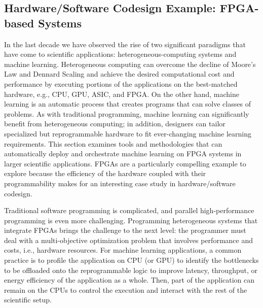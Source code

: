 \subsection{Hardware/Software Codesign Example: FPGA-based Systems}
\label{sec:codesign}

In the last decade we have observed the rise of two significant paradigms that have come to scientific applications: heterogeneous-computing systems and machine learning. Heterogeneous computing can overcome the decline of Moore's Law and Dennard Scaling and achieve the desired computational cost and performance by executing portions of the applications on the best-matched hardware, e.g., CPU, GPU, ASIC, and FPGA. On the other hand, machine learning is an automatic process that creates programs that can solve classes of problems. As with traditional programming, machine learning can significantly benefit from heterogeneous computing; in addition, designers can tailor specialized but reprogrammable hardware to fit ever-changing machine learning requirements. This section examines tools and methodologies that can automatically deploy and orchestrate machine learning on FPGA systems in larger scientific applications.  FPGAs are a particularly compelling example to explore because the efficiency of the hardware coupled with their programmability makes for an interesting case study in hardware/software codesign.   

Traditional software programming is complicated, and parallel high-performance programming is even more challenging. Programming heterogeneous systems that integrate FPGAs brings the challenge to the next level: the programmer must deal with a multi-objective optimization problem that involves performance and costs, i.e., hardware resources.
For machine learning applications, a common practice is to profile the application on CPU (or GPU) to identify the bottlenecks to be offloaded onto the reprogrammable logic to improve latency, throughput, or energy efficiency of the application as a whole. Then, part of the application can remain on the CPUs to control the execution and interact with the rest of the scientific setup.

